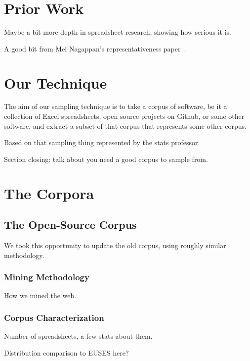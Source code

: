 \documentclass{sig-alternate} %
\begin{document}
\section{Prior Work}

Maybe a bit more depth in spreadsheet research, showing how serious it is.

A good bit from Mei Nagappan's representativeness paper~\cite{nag13}.

\section{Our Technique}

The aim of our sampling technique is to take a corpus of software, be it 
a collection of Excel spreadsheets, open source projects on Github, 
or some other software, and extract a subset of that corpus that represents
some other corpus.

Based on that sampling thing represented by the stats professor.

Section closing: talk about you need a good corpus to sample from.

\section{The Corpora}

\subsection{The Open-Source Corpus}

We took this opportunity to update the old corpus, using roughly similar
methodology.

\subsubsection{Mining Methodology}

How we mined the web.

\subsubsection{Corpus Characterization}

Number of spreadsheets, a few stats about them.

Distribution comparison to EUSES here?
\end{document}
